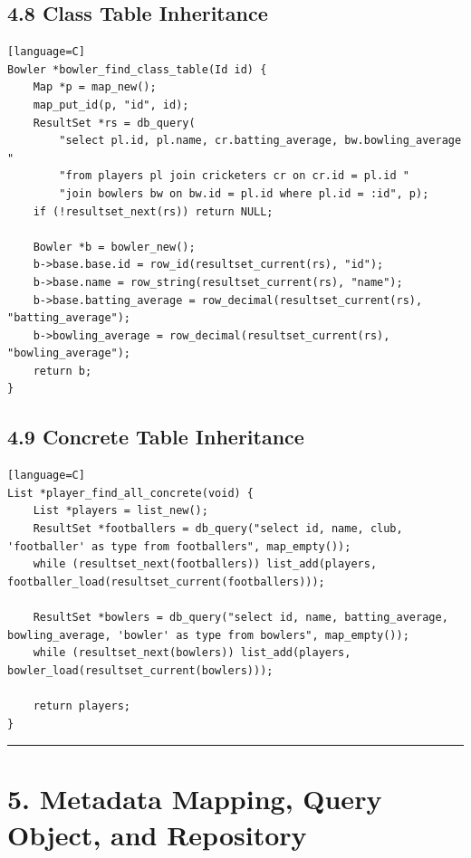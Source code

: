\documentclass[11pt]{article}
\begin{document}
\subsection{4.8 Class Table Inheritance}\label{class-table-inheritance}

\begin{verbatim}[language=C]
Bowler *bowler_find_class_table(Id id) {
    Map *p = map_new();
    map_put_id(p, "id", id);
    ResultSet *rs = db_query(
        "select pl.id, pl.name, cr.batting_average, bw.bowling_average "
        "from players pl join cricketers cr on cr.id = pl.id "
        "join bowlers bw on bw.id = pl.id where pl.id = :id", p);
    if (!resultset_next(rs)) return NULL;

    Bowler *b = bowler_new();
    b->base.base.id = row_id(resultset_current(rs), "id");
    b->base.name = row_string(resultset_current(rs), "name");
    b->base.batting_average = row_decimal(resultset_current(rs), "batting_average");
    b->bowling_average = row_decimal(resultset_current(rs), "bowling_average");
    return b;
}
\end{verbatim}

\subsection{4.9 Concrete Table
Inheritance}\label{concrete-table-inheritance}

\begin{verbatim}[language=C]
List *player_find_all_concrete(void) {
    List *players = list_new();
    ResultSet *footballers = db_query("select id, name, club, 'footballer' as type from footballers", map_empty());
    while (resultset_next(footballers)) list_add(players, footballer_load(resultset_current(footballers)));

    ResultSet *bowlers = db_query("select id, name, batting_average, bowling_average, 'bowler' as type from bowlers", map_empty());
    while (resultset_next(bowlers)) list_add(players, bowler_load(resultset_current(bowlers)));

    return players;
}
\end{verbatim}

\begin{center}\rule{0.5\linewidth}{0.5pt}\end{center}

\section{5. Metadata Mapping, Query Object, and
Repository}\label{metadata-mapping-query-object-and-repository}
\end{document}
